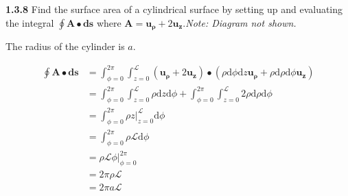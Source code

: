 \documentclass{article}
\begin{document}
\textbf{1.3.8} Find the surface area of a cylindrical surface by setting up and evaluating the integral $\oint
	\mathbf{A} \bullet \mathbf{ds}$ where $\mathbf{A} = \mathbf{u_\rho} + 2\mathbf{u_z}$.\@ \textit{Note: Diagram not
	shown.}

\vspace{24pt}

The radius of the cylinder is $a$.

\begin{equation*}
	\begin{split}
		\oint \mathbf{A} \bullet \mathbf{ds} & = \int_{\phi=0}^{2\pi} \int_{z=0}^\mathscr{L} (\mathbf{u_\rho} + 2\mathbf{u_z}) \bullet (\rho \text{d}\phi \text{d}z \mathbf{u_\rho} + \rho \text{d}\rho \text{d}\phi \mathbf{u_z}) \\
		& = \int_{\phi=0}^{2\pi} \int_{z=0}^\mathscr{L} \rho \text{d}z \text{d}\phi + \int_{\phi=0}^{2\pi} \int_{z=0}^\mathscr{L} 2\rho \text{d}\rho \text{d}\phi \\
		& = \int_{\phi=0}^{2\pi} \rho z \rvert_{z=0}^\mathscr{L} \text{d}\phi \\
		& = \int_{\phi=0}^{2\pi} \rho \mathscr{L} \text{d}\phi \\
		& = \rho \mathscr{L} \phi \rvert_{\phi=0}^{2\pi} \\
		& = 2 \pi \rho \mathscr{L} \\
		& = 2 \pi a \mathscr{L}
	\end{split}
\end{equation*}
\end{document}
